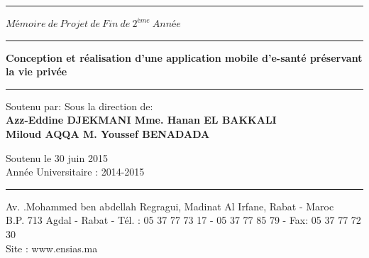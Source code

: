 \begin{titlepage}
\begin{center}
	\rule{\linewidth}{1pt}
	
	\vspace{4.65cm}
	
	\huge $Mémoire \ de \ Projet \ de \ Fin \ de \ 2^{ème} \ Année$
	
	\vspace{1.5cm} 
	
	\rule{\linewidth}{2pt}
	
	\Large
	\textbf{Conception et réalisation d'une application mobile d'e-santé préservant la vie privée}
	
	\rule{\linewidth}{2pt}
	
	\vspace{1.5cm}
	
	\begin{flushleft}
	
	\normalsize{Soutenu par:} \hfill Sous la direction de: \\
	\vspace{10pt}
	\textbf{Azz-Eddine DJEKMANI \hfill Mme. Hanan EL BAKKALI} \\
	\textbf{Miloud AQQA \hfill M. Youssef BENADADA}
	
	\end{flushleft}
	
	\begin{center}
	
			\vspace{74pt}
			\normalsize{Soutenu le 30 juin 2015} \\
			\vspace{39pt}
			Année Universitaire : 2014-2015
			\vspace{6pt}
			
			\rule{\linewidth}{1pt}
			\footnotesize Av. .Mohammed ben abdellah Regragui, Madinat Al Irfane, Rabat - Maroc\\
			B.P. 713 Agdal - Rabat - Tél. : 05 37 77 73 17 - 05 37 77 85 79 - Fax: 05 37 77 72 30\\
			Site : www.ensias.ma 
	
	\end{center}
	
\end{center}

\end{titlepage}
